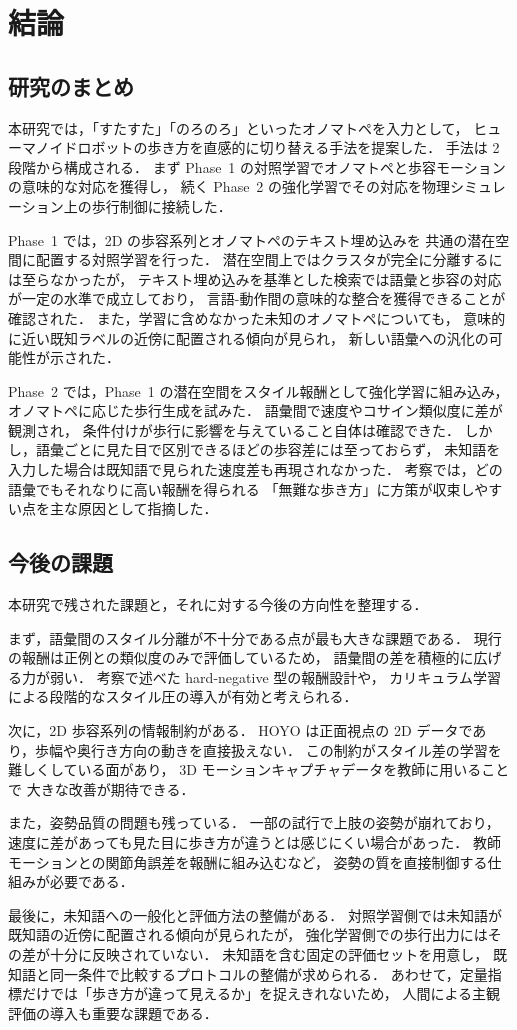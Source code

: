 \chapter{結論}
\label{chap:結論}

\section{研究のまとめ}

本研究では，「すたすた」「のろのろ」といったオノマトペを入力として，
ヒューマノイドロボットの歩き方を直感的に切り替える手法を提案した．
手法は 2 段階から構成される．
まず Phase~1 の対照学習でオノマトペと歩容モーションの意味的な対応を獲得し，
続く Phase~2 の強化学習でその対応を物理シミュレーション上の歩行制御に接続した．

Phase~1 では，2D の歩容系列とオノマトペのテキスト埋め込みを
共通の潜在空間に配置する対照学習を行った．
潜在空間上ではクラスタが完全に分離するには至らなかったが，
テキスト埋め込みを基準とした検索では語彙と歩容の対応が一定の水準で成立しており，
言語-動作間の意味的な整合を獲得できることが確認された．
また，学習に含めなかった未知のオノマトペについても，
意味的に近い既知ラベルの近傍に配置される傾向が見られ，
新しい語彙への汎化の可能性が示された．

Phase~2 では，Phase~1 の潜在空間をスタイル報酬として強化学習に組み込み，
オノマトペに応じた歩行生成を試みた．
語彙間で速度やコサイン類似度に差が観測され，
条件付けが歩行に影響を与えていること自体は確認できた．
しかし，語彙ごとに見た目で区別できるほどの歩容差には至っておらず，
未知語を入力した場合は既知語で見られた速度差も再現されなかった．
考察では，どの語彙でもそれなりに高い報酬を得られる
「無難な歩き方」に方策が収束しやすい点を主な原因として指摘した．

\section{今後の課題}

本研究で残された課題と，それに対する今後の方向性を整理する．

まず，語彙間のスタイル分離が不十分である点が最も大きな課題である．
現行の報酬は正例との類似度のみで評価しているため，
語彙間の差を積極的に広げる力が弱い．
考察で述べた hard-negative 型の報酬設計や，
カリキュラム学習による段階的なスタイル圧の導入が有効と考えられる．

次に，2D 歩容系列の情報制約がある．
HOYO は正面視点の 2D データであり，歩幅や奥行き方向の動きを直接扱えない．
この制約がスタイル差の学習を難しくしている面があり，
3D モーションキャプチャデータを教師に用いることで
大きな改善が期待できる．

また，姿勢品質の問題も残っている．
一部の試行で上肢の姿勢が崩れており，
速度に差があっても見た目に歩き方が違うとは感じにくい場合があった．
教師モーションとの関節角誤差を報酬に組み込むなど，
姿勢の質を直接制御する仕組みが必要である．

最後に，未知語への一般化と評価方法の整備がある．
対照学習側では未知語が既知語の近傍に配置される傾向が見られたが，
強化学習側での歩行出力にはその差が十分に反映されていない．
未知語を含む固定の評価セットを用意し，
既知語と同一条件で比較するプロトコルの整備が求められる．
あわせて，定量指標だけでは「歩き方が違って見えるか」を捉えきれないため，
人間による主観評価の導入も重要な課題である．

